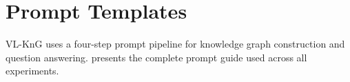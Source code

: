




\section{Prompt Templates}
\label{sec:prompts}

VL-KnG uses a four-step prompt pipeline for knowledge graph construction and question answering.  presents the complete prompt guide used across all experiments.



